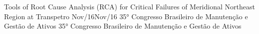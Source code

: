     \vspace{1mm}
                {Tools of Root Cause Analysis (RCA) for Critical Failures of Meridional Northeast Region at Transpetro}
                {Nov/16}{Nov/16}
                {35° Congresso Brasileiro de Manutenção e Gestão de Ativos}
                {35° Congresso Brasileiro de Manutenção e Gestão de Ativos}

